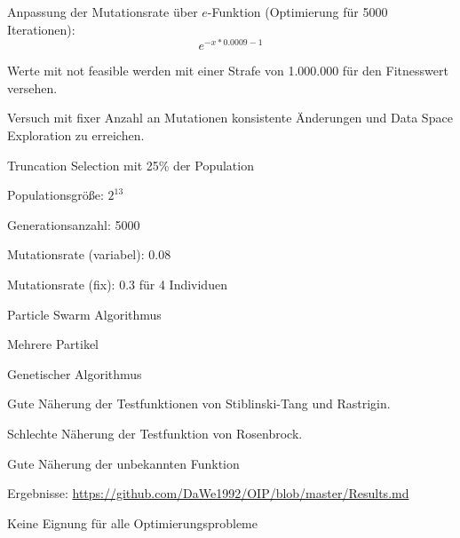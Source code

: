 \documentclass[t,8pt]{beamer}
\begin{document}
\begin{dwFrame}

	\begin{dwItemize}
		\item Anpassung der Mutationsrate über $e$-Funktion (Optimierung für 5000 Iterationen):\\
			\begin{equation*}
				e^{-x*0.0009-1}
			\end{equation*}
		\item Werte mit \glqq  not feasible\grqq{} werden mit einer Strafe von 1.000.000 für den Fitnesswert versehen. 
		\item Versuch mit fixer Anzahl an Mutationen konsistente Änderungen und Data Space Exploration zu erreichen. 
		\item Truncation Selection mit 25\% der Population 
	\end{dwItemize}
		\vspace{2mm}
	\dwHeader{Parameter}
	\begin{dwItemize}
		\item Populationsgröße: $2^{13}$
		\item Generationsanzahl: 5000
		\item Mutationsrate (variabel): 0.08
		\item Mutationsrate (fix): 0.3 für 4 Individuen
	\end{dwItemize}
		
\end{dwFrame}

\begin{dwHeaderFrame}{Particle Swarm Algorithmus}
	\begin{dwItemize}
		\item Mehrere Partikel
	\end{dwItemize}
\end{dwHeaderFrame}

\begin{dwHeaderFrame}{Genetischer Algorithmus}
	\begin{dwItemize}
		\item Gute Näherung der Testfunktionen von Stiblinski-Tang und Rastrigin.
		\item Schlechte Näherung der Testfunktion von Rosenbrock.
		\item Gute Näherung der unbekannten Funktion
		\item Ergebnisse: \url{https://github.com/DaWe1992/OIP/blob/master/Results.md}
		\item Keine Eignung für alle Optimierungsprobleme
	\end{dwItemize}
\end{dwHeaderFrame}
\end{document}
